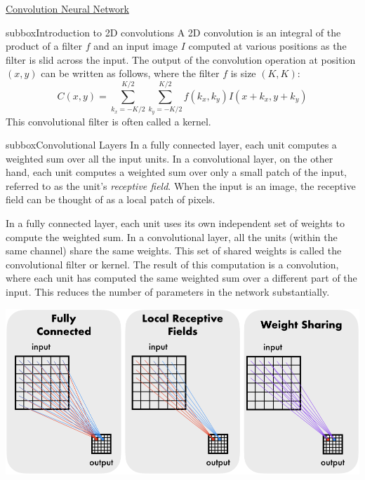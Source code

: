 \begin{textbox}{\href{https://compneuro.neuromatch.io/tutorials/W1D5_DeepLearning/student/W1D5_Tutorial2.html}{Convolution Neural Network } }
\begin{subbox}{subbox}{Introduction to 2D convolutions}
\scriptsize
A 2D convolution is an integral of the product of a filter $f$ and an input image $I$ computed at various positions as the filter is slid across the input. The output of the convolution operation at position $(x,y)$ can be written as follows, where the filter $f$ is size $(K,K)$:
\begin{equation}
C(x,y) = \sum_{k_x=-K/2}^{K/2} \sum_{k_y=-K/2}^{K/2} f(k_x,k_y) I(x+k_x,y+k_y)
\end{equation}
This convolutional filter is often called a kernel.
\end{subbox}
\begin{subbox}{subbox}{Convolutional Layers}
\scriptsize
In a fully connected layer, each unit computes a weighted sum over all the input units. In a convolutional layer, on the other hand, each unit computes a weighted sum over only a small patch of the input, referred to as the unit's \textit{receptive field}. When the input is an image, the receptive field can be thought of as a local patch of pixels.
  
In a fully connected layer, each unit uses its own independent set of weights to compute the weighted sum. In a convolutional layer, all the units (within the same channel) share the same weights. This set of shared weights is called the convolutional filter or kernel. The result of this computation is a convolution, where each unit has computed the same weighted sum over a different part of the input. This reduces the number of parameters in the network substantially.

\centering
\includegraphics[scale=0.2]{Figures/DL/DLFigure3.png}
\end{subbox}
\end{textbox}
